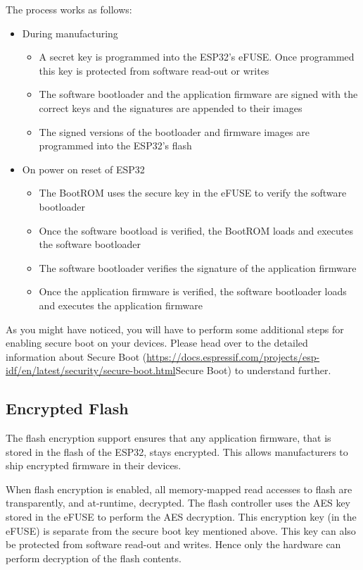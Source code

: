 \documentclass[main.tex]{subfiles}
\begin{document}
The process works as follows:
\begin{itemize}
\item During manufacturing
  \begin {itemize}
  \item A secret key is programmed into the ESP32's eFUSE. Once programmed this key is protected from software read-out or writes
  \item The software bootloader and the application firmware are signed with the correct keys and the signatures are appended to their images
  \item The signed versions of the bootloader and firmware images are programmed into the ESP32's flash
  \end {itemize}
\item On power on reset of ESP32
  \begin {itemize}
  \item The BootROM uses the secure key in the eFUSE to verify the software bootloader
  \item Once the software bootload is verified, the BootROM loads and executes the software bootloader
  \item The software bootloader verifies the signature of the application firmware
  \item Once the application firmware is verified, the software bootloader loads and executes the application firmware
  \end {itemize}
\end{itemize}

As you might have noticed, you will have to perform some additional steps for enabling secure boot on your devices. Please head over to the detailed information about Secure Boot (\url{https://docs.espressif.com/projects/esp-idf/en/latest/security/secure-boot.html}{Secure Boot}) to understand further.

\subsection{Encrypted Flash}
The flash encryption support ensures that any application firmware, that is stored in the flash of the ESP32, stays encrypted. This allows manufacturers to ship encrypted firmware in their devices.

When flash encryption is enabled, all memory-mapped read accesses to flash are transparently, and at-runtime, decrypted. The flash controller uses the AES key stored in the eFUSE to perform the AES decryption. This encryption key (in the eFUSE) is separate from the secure boot key mentioned above. This key can also be protected from software read-out and writes. Hence only the hardware can perform decryption of the flash contents.
\end{document}
